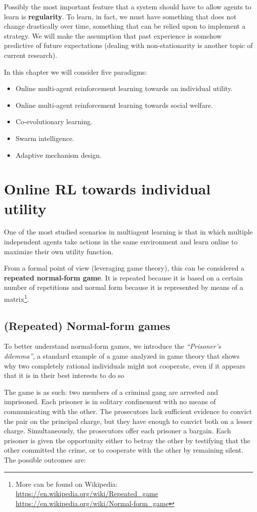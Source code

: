Possibly the most important feature that a system should have to allow agents to learn is \textbf{regularity}. To learn, in fact, we must have something that does not change drastically over time, something that can be relied upon to implement a strategy. We will make the assumption that past experience is somehow predictive of future expectations (dealing with non-stationarity is another topic of current research).

In this chapter we will consider five paradigms:

\begin{itemize}
    \item Online multi-agent reinforcement learning towards an individual utility.
    \item Online multi-agent reinforcement learning towards social welfare.
    \item Co-evolutionary learning.
    \item Swarm intelligence.
    \item Adaptive mechanism design.
\end{itemize}

\section{Online RL towards individual utility}
One of the most studied scenarios in multiagent learning is that in which multiple independent agents take actions in the same environment and learn online to maximize their own utility function.

From a formal point of view (leveraging game theory), this can be considered a \textbf{repeated normal-form game}. It is repeated because it is based on a certain number of repetitions and normal form because it is represented by means of a matrix\footnote{More can be found on Wikipedia: \url{https://en.wikipedia.org/wiki/Repeated_game} \url{https://en.wikipedia.org/wiki/Normal-form_game}}.

\subsection{(Repeated) Normal-form games}
To better understand normal-form games, we introduce the \textit{``Prisoner’s dilemma''}, a standard example of a game analyzed in game theory that shows why two completely rational individuals might not cooperate, even if it appears that it is in their best interests to do so

The game is as such: two members of a criminal gang are arrested and imprisoned. Each prisoner is in solitary confinement with no means of communicating with the other. The prosecutors lack sufficient evidence to convict the pair on the principal charge, but they have enough to convict both on a lesser charge. Simultaneously, the prosecutors offer each prisoner a bargain. Each prisoner is given the opportunity either to betray the other by testifying that the other committed the crime, or to cooperate with the other by remaining silent. The possible outcomes are:

